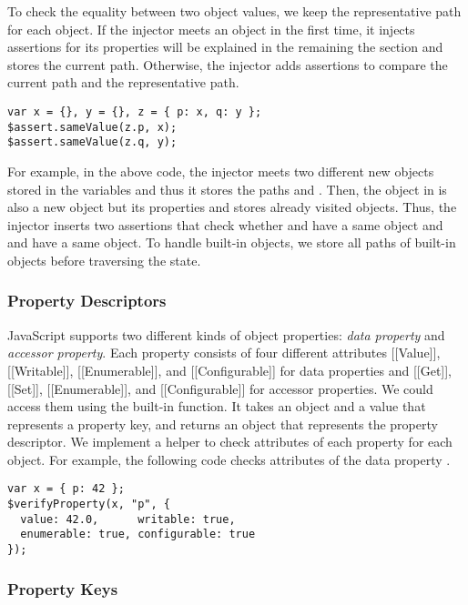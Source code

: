 To check the equality between two object values, we keep the representative path
for each object.  If the injector meets an object in the first time, it injects
assertions for its properties will be explained in the remaining the section and
stores the current path.  Otherwise, the injector adds assertions to compare the
current path and the representative path.
\begin{lstlisting}[style=myJSstyle]
var x = {}, y = {}, z = { p: x, q: y };
$assert.sameValue(z.p, x);
$assert.sameValue(z.q, y);
\end{lstlisting}
For example, in the above code, the injector meets two different new objects
stored in the variables  and  thus it stores the paths 
and .  Then, the object in  is also a new object but its
properties  and  stores already visited objects.  Thus, the
injector inserts two assertions that check whether  and  have
a same object and  and  have a same object.  To handle
built-in objects, we store all paths of built-in objects before traversing the
state.


\subsubsection{Property Descriptors}

JavaScript supports two different kinds of object properties: \textit{data
property} and \textit{accessor property}.  Each property consists of four
different attributes [[Value]], [[Writable]], [[Enumerable]], and
[[Configurable]] for data properties and [[Get]], [[Set]], [[Enumerable]], and
[[Configurable]] for accessor properties.  We could access them using the
 built-in function.  It takes an object
and a value that represents a property key, and returns an object that
represents the property descriptor.  We implement a helper
 to check attributes of each property for each object.
For example, the following code checks attributes of the data property
.
\begin{lstlisting}[style=myJSstyle]
var x = { p: 42 };
$verifyProperty(x, "p", {
  value: 42.0,      writable: true,
  enumerable: true, configurable: true
});
\end{lstlisting}


\subsubsection{Property Keys}

